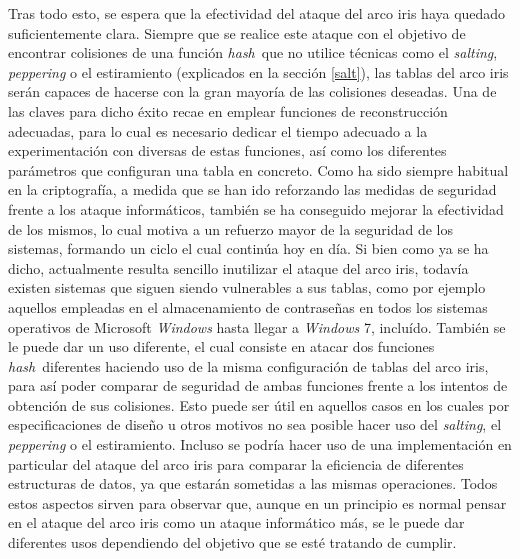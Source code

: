 \documentclass[12pt,spanish,listoffigures,listoftables,listofalgorithms]{tfgetsinf}
\newcommand{\hash}{\textit{hash}}
\begin{document}
Tras todo esto, se espera que la efectividad del ataque del arco iris haya quedado suficientemente clara. Siempre que se realice este ataque con el objetivo de encontrar colisiones de una función \hash~que no utilice técnicas como el \textit{salting}, \textit{peppering} o el estiramiento (explicados en la sección \ref{salt}), las tablas del arco iris serán capaces de hacerse con la gran mayoría de las colisiones deseadas. Una de las claves para dicho éxito recae en emplear funciones de reconstrucción adecuadas, para lo cual es necesario dedicar el tiempo adecuado a la experimentación con diversas de estas funciones, así como los diferentes parámetros que configuran una tabla en concreto. Como ha sido siempre habitual en la criptografía, a medida que se han ido reforzando las medidas de seguridad frente a los ataque informáticos, también se ha conseguido mejorar la efectividad de los mismos, lo cual motiva a un refuerzo mayor de la seguridad de los sistemas, formando un ciclo el cual continúa hoy en día. Si bien como ya se ha dicho, actualmente resulta sencillo inutilizar el ataque del arco iris, todavía existen sistemas que siguen siendo vulnerables a sus tablas, como por ejemplo aquellos empleadas en el almacenamiento de contraseñas en todos los sistemas operativos de Microsoft \textit{Windows} hasta llegar a \textit{Windows} 7, incluído. También  se le puede dar un uso diferente, el cual consiste en atacar dos funciones \hash~diferentes haciendo uso de la misma configuración de tablas del arco iris, para así poder comparar de seguridad de ambas funciones frente a los intentos de obtención de sus colisiones. Esto puede ser útil en aquellos casos en los cuales por especificaciones de diseño u otros motivos no sea posible hacer uso del \textit{salting}, el \textit{peppering} o el estiramiento. Incluso se podría hacer uso de una implementación en particular del ataque del arco iris para comparar la eficiencia de diferentes estructuras de datos, ya que estarán sometidas a las mismas operaciones. Todos estos aspectos sirven para observar que, aunque en un principio es normal pensar en el ataque del arco iris como un ataque informático más, se le puede dar diferentes usos dependiendo del objetivo que se esté tratando de cumplir. 




\end{document}
